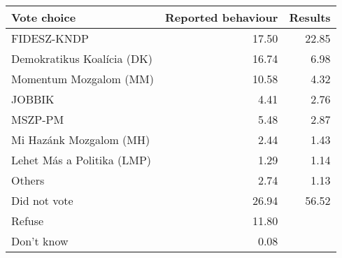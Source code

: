 
\begin{tabular}{l|rr}
\hline
Vote choice & Reported behaviour & Results\\
\hline
FIDESZ-KNDP & 17.50 & 22.85\\
Demokratikus Koalícia (DK) & 16.74 & 6.98\\
Momentum Mozgalom (MM) & 10.58 & 4.32\\
JOBBIK & 4.41 & 2.76\\
MSZP-PM & 5.48 & 2.87\\
Mi Hazánk Mozgalom (MH) & 2.44 & 1.43\\
Lehet Más a Politika (LMP) & 1.29 & 1.14\\
Others & 2.74 & 1.13\\
Did not vote & 26.94 & 56.52\\
Refuse & 11.80 & \\
Don't know & 0.08 & \\
\hline
\end{tabular}

